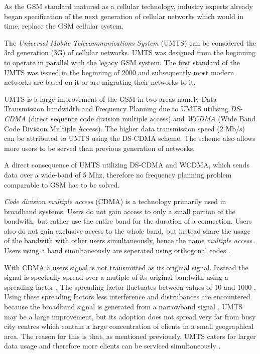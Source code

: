 As the GSM standard matured as a cellular technology, industry experts already began specification of the next generation of cellular networks which would in time, replace the GSM cellular system. 

The \emph{Universal Mobile Telecommunications System} (UMTS) can be considered the 3rd generation (3G) of cellular networks. UMTS was designed from the beginning to operate in parallel with the legacy GSM system. The first standard of the UMTS was issued in the beginning of 2000 and subsequently most modern networks are based on it or are migrating their networks to it.

UMTS is a large improvement of the GSM in two areas namely Data Transmission bandwidth and Frequency Planning due to UMTS utilising \emph{DS-CDMA} (direct sequence code division multiple access) and \emph{WCDMA} (Wide Band Code Division Multiple Access). The higher data transmission speed (2 Mb/s) can be attributed to UMTS using the DS-CDMA scheme. The scheme also allows more users to be served than previous generation of networks\cite{tabuglobalplanning3g,Eisenblatter}. 

A direct consequence of UMTS utilizing DS-CDMA and WCDMA, which sends data over a wide-band of 5 Mhz, therefore no frequency planning problem comparable to GSM has to be solved\cite{tabuglobalplanning3g,Eisenblatter}. 

\emph{Code division multiple access} (CDMA) is a technology primarily used in broadband systems. Users do not gain access to only a small portion of the bandwith, but rather use the entire band for the duration of a connection. Users also do not gain exclusive access to the whole band, but instead share the usage of the bandwith with other users simultaneously, hence the name \emph{multiple access}. Users using a band simultaneously are seperated using orthogonal codes \cite{GSMArchitectureProtocolsServices}.

With CDMA a users signal is not transmitted as its original signal. Instead the signal is spectrally spread over a mutiple of its original bandwith using a spreading factor \cite{GSMArchitectureProtocolsServices}. The spreading factor fluctuates between values of 10 and 1000 \cite{GSMArchitectureProtocolsServices}. Using these spreading factors less interference and distrubances are encountered because the broadband signal is generated from a narrowband signal \cite{GSMArchitectureProtocolsServices}.
UMTS may be a large improvement, but its adoption does not spread very far from busy city centres which contain a large concentration of clients in a small geographical area. The reason for this is that, as mentioned previously, UMTS caters for larger data usage and therefore more clients can be serviced simultaneously \cite{GSMArchitectureProtocolsServices}.

